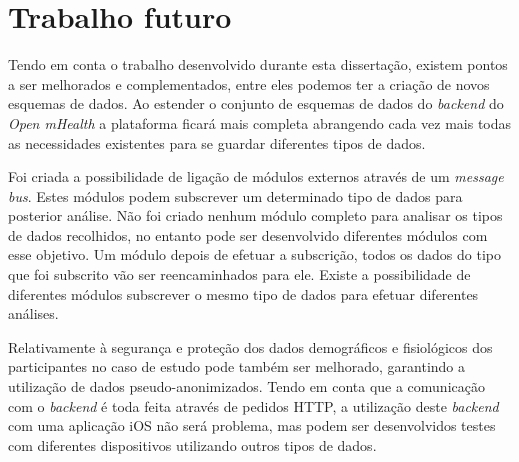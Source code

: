 \section{Trabalho futuro}
Tendo em conta o trabalho desenvolvido durante esta dissertação, existem pontos a ser melhorados e complementados, entre eles podemos ter a criação de novos esquemas de dados. Ao estender o conjunto de esquemas de dados do \textit{backend} do \textit{Open mHealth} a plataforma ficará mais completa abrangendo cada vez mais todas as necessidades existentes para se guardar diferentes tipos de dados.\par
Foi criada a possibilidade de ligação de módulos externos através de um \textit{message bus}. Estes módulos podem subscrever um determinado tipo de dados para posterior análise. Não foi criado nenhum módulo completo para analisar os tipos de dados recolhidos, no entanto pode ser desenvolvido diferentes módulos com esse objetivo. Um módulo depois de efetuar a subscrição, todos os dados do tipo que foi subscrito vão ser reencaminhados para ele. Existe a possibilidade de diferentes módulos subscrever o mesmo tipo de dados para efetuar diferentes análises.\par
Relativamente à segurança e proteção dos dados demográficos e fisiológicos dos participantes no caso de estudo pode também ser melhorado, garantindo a utilização de dados pseudo-anonimizados.
Tendo em conta que a comunicação com o \textit{backend} é toda feita através de pedidos \gls{HTTP}, a utilização deste \textit{backend} com uma aplicação iOS não será problema, mas podem ser desenvolvidos testes com diferentes dispositivos utilizando outros tipos de dados.

\cleardoublepage